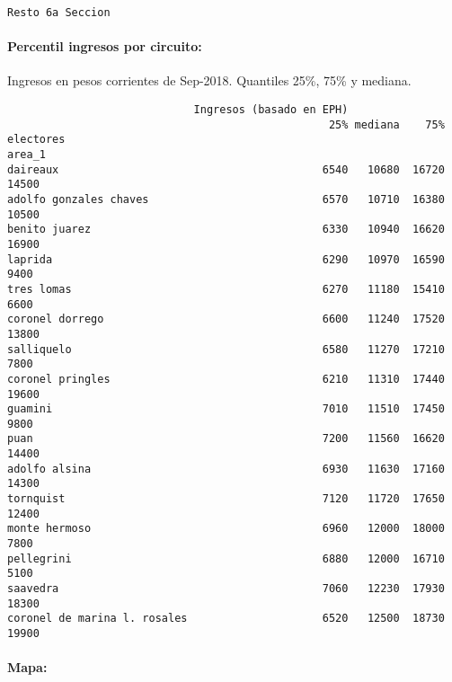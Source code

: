 \documentclass[11pt]{article}
\begin{document}
    
    \begin{Verbatim}[commandchars=\\\{\}]
Resto 6a Seccion

    \end{Verbatim}

    \hypertarget{percentil-ingresos-por-circuito}{%
\paragraph{Percentil ingresos por
circuito:}\label{percentil-ingresos-por-circuito}}

    
    Ingresos en pesos corrientes de Sep-2018. Quantiles 25\%, 75\% y
mediana.

    
    
    \begin{verbatim}
                             Ingresos (basado en EPH)                         
                                                  25% mediana    75% electores
area_1                                                                        
daireaux                                         6540   10680  16720     14500
adolfo gonzales chaves                           6570   10710  16380     10500
benito juarez                                    6330   10940  16620     16900
laprida                                          6290   10970  16590      9400
tres lomas                                       6270   11180  15410      6600
coronel dorrego                                  6600   11240  17520     13800
salliquelo                                       6580   11270  17210      7800
coronel pringles                                 6210   11310  17440     19600
guamini                                          7010   11510  17450      9800
puan                                             7200   11560  16620     14400
adolfo alsina                                    6930   11630  17160     14300
tornquist                                        7120   11720  17650     12400
monte hermoso                                    6960   12000  18000      7800
pellegrini                                       6880   12000  16710      5100
saavedra                                         7060   12230  17930     18300
coronel de marina l. rosales                     6520   12500  18730     19900
    \end{verbatim}

    
    \hypertarget{mapa}{%
\paragraph{Mapa:}\label{mapa}}
\end{document}
